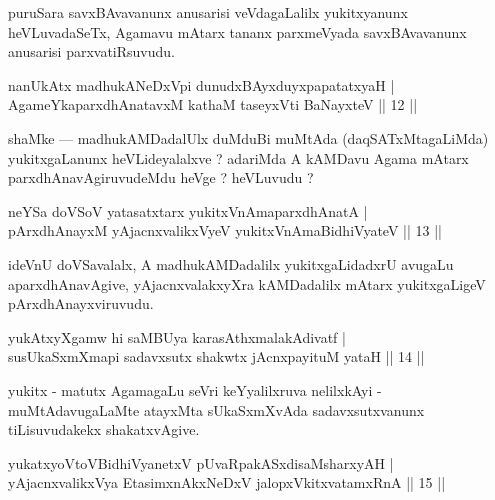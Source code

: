 \begin{artha}
puruSara savxBAvavanunx anusarisi veVdagaLalilx yukitxyanunx heVLuvadaSeTx, Agamavu mAtarx tananx parxmeVyada savxBAvavanunx anusarisi parxvatiRsuvudu.
\end{artha}


\begin{shl}
nanUkAtx madhukANeDxV\s pi dunudxBAyxduyxpapatatxyaH |\\
AgameYkaparxdhAnatavxM kathaM taseyxVti BaNayxteV \hfill || 12 || 
\end{shl}

\begin{artha}
shaMke --- madhukAMDadalUlx duMduBi muMtAda (daqSATxMtagaLiMda) yukitxgaLanunx heVLideyalalxve ? adariMda A kAMDavu Agama mAtarx parxdhAnavAgiruvudeMdu heVge ? heVLuvudu ?
\end{artha}


\begin{shl}
neYSa doVSoV yatasatxtarx yukitxVnAmaparxdhAnatA |\\
pArxdhAnayxM yAjacnxvalikxVyeV yukitxVnAmaBidhiVyateV \hfill || 13 || 
\end{shl}

\begin{artha}
ideVnU doVSavalalx, A madhukAMDadalilx yukitxgaLidadxrU avugaLu aparxdhAnavAgive, yAjacnxvalakxyXra kAMDadalilx mAtarx yukitxgaLigeV pArxdhAnayxviruvudu.
\end{artha}

\begin{shl}
yukAtxyXgamw hi saMBUya karasAthxmalakAdivatf |\\
susUkaSxmXmapi sadavxsutx shakwtx jAcnxpayituM yataH \hfill || 14 ||
\end{shl}

\begin{artha}
yukitx - matutx AgamagaLu seVri keYyalilxruva nelilxkAyi - muMtAdavugaLaMte atayxMta sUkaSxmXvAda sadavxsutxvanunx tiLisuvudakekx shakatxvAgive.
\end{artha}

\begin{shl}
yukatxyoV\s toV\s BidhiVyanetxV pUvaRpakASxdisaMsharxyAH |\\
yAjacnxvalikxVya EtasimxnAkxNeDxV jalopxVkitxvatamxRnA \hfill || 15 ||
\end{shl}

